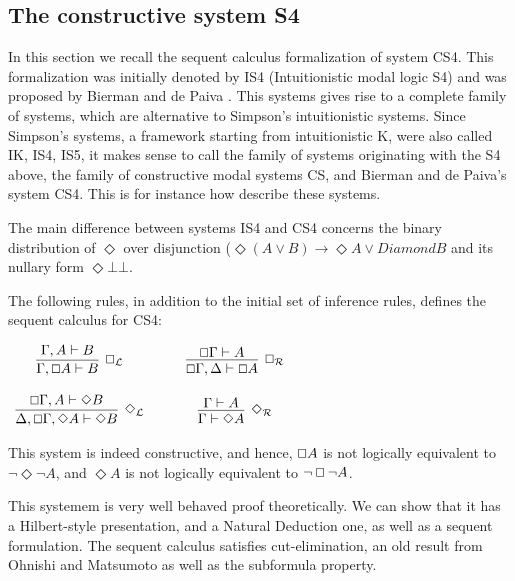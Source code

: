 \documentclass{article}
\renewcommand{\Box}{\oblong}
\begin{document}
\subsection{The constructive system S4} 

In this section we recall the sequent calculus formalization of system CS4.  This formalization was initially denoted by IS4 (Intuitionistic modal logic S4) and was proposed by
Bierman and de Paiva \cite{CS4}.  This systems gives rise to a complete family of systems, which are alternative to Simpson's intuitionistic systems. Since  Simpson's systems,  a framework starting from intuitionistic K,  were also called IK, IS4, IS5, it makes  sense to call the family of systems originating with the S4 above, the family of constructive modal systems CS, and Bierman and de Paiva's system CS4.  This is for instance how \cite{arisaka2015} describe these systems. 

The main difference between systems IS4 and CS4 concerns the binary distribution of $\Diamond$ over disjunction ($\Diamond (A\lor B)\to \Diamond A\lor Diamond B$ and its nullary form $\Diamond \bot\bot$.

The following rules, in addition to
the initial set of inference rules, defines the sequent calculus for CS4:
\begin{center}
  \begin{math}
    \begin{array}{ccccc}              
      \infer[\Box_{\mathcal{L}}]{\Gamma, \Box A \vdash B}{
        \Gamma,A \vdash B
      }
      & \quad &
      \infer[\Box_{\mathcal{R}}]{\Box\Gamma,\Delta \vdash \Box A}{
        \Box \Gamma \vdash A
      }\\\\
      \infer[\Diamond_{\mathcal{L}}]{\Delta,\Box\Gamma,\Diamond A \vdash \Diamond B}{
        \Box\Gamma,A \vdash \Diamond B
      }
      & \quad &
      \infer[\Diamond_{\mathcal{R}}]{\Gamma \vdash \Diamond A}{
        \Gamma \vdash A
      }
    \end{array}        
  \end{math}
\end{center}
This system is indeed constructive, and hence, $\Box A$ is not
logically equivalent to $\lnot \Diamond \lnot A$, and $\Diamond A$ is
not logically equivalent to $\lnot \Box \lnot A$.

This systemem is very well behaved proof theoretically. We can show that it has a Hilbert-style presentation, and a Natural Deduction one, as well as a sequent formulation. The sequent calculus satisfies cut-elimination, an old result from Ohnishi and Matsumoto \cite{ohnishi1957} as well as the subformula property. 
\end{document}
